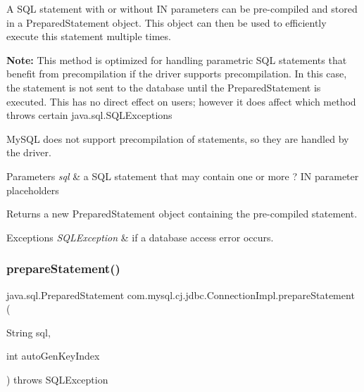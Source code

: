 A S\+QL statement with or without IN parameters can be pre-\/compiled and stored in a Prepared\+Statement object. This object can then be used to efficiently execute this statement multiple times. 

{\bfseries Note\+:} This method is optimized for handling parametric S\+QL statements that benefit from precompilation if the driver supports precompilation. In this case, the statement is not sent to the database until the Prepared\+Statement is executed. This has no direct effect on users; however it does affect which method throws certain java.\+sql.\+S\+Q\+L\+Exceptions 

My\+S\+QL does not support precompilation of statements, so they are handled by the driver. 


\begin{DoxyParams}{Parameters}
{\em sql} & a S\+QL statement that may contain one or more \textquotesingle{}?\textquotesingle{} IN parameter placeholders \\
\hline
\end{DoxyParams}
\begin{DoxyReturn}{Returns}
a new Prepared\+Statement object containing the pre-\/compiled statement. 
\end{DoxyReturn}

\begin{DoxyExceptions}{Exceptions}
{\em S\+Q\+L\+Exception} & if a database access error occurs. \\
\hline
\end{DoxyExceptions}
\mbox{\label{classcom_1_1mysql_1_1cj_1_1jdbc_1_1_connection_impl_a6ad097415e0e105b2d7629cc4d6e24a5}} 
\subsubsection{\texorpdfstring{prepare\+Statement()}{prepareStatement()}\hspace{0.1cm}{\footnotesize\ttfamily [2/6]}}
{\footnotesize\ttfamily java.\+sql.\+Prepared\+Statement com.\+mysql.\+cj.\+jdbc.\+Connection\+Impl.\+prepare\+Statement (\begin{DoxyParamCaption}\item[{String}]{sql,  }\item[{int}]{auto\+Gen\+Key\+Index }\end{DoxyParamCaption}) throws S\+Q\+L\+Exception}

